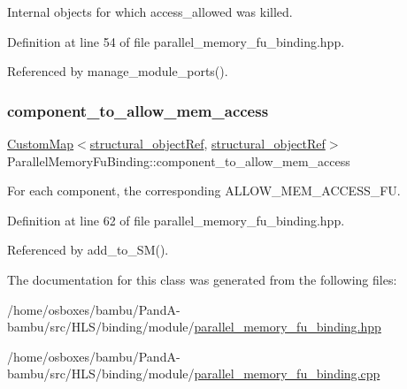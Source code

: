 Internal objects for which access\+\_\+allowed was killed. 



Definition at line 54 of file parallel\+\_\+memory\+\_\+fu\+\_\+binding.\+hpp.



Referenced by manage\+\_\+module\+\_\+ports().

\mbox{\label{classParallelMemoryFuBinding_a4f44f1a4a3686f6881467732a8935287}} 
\subsubsection{\texorpdfstring{component\+\_\+to\+\_\+allow\+\_\+mem\+\_\+access}{component\_to\_allow\_mem\_access}}
{\footnotesize\ttfamily \hyperlink{custom__map_8hpp_a18ca01763abbe3e5623223bfe5aaac6b}{Custom\+Map}$<$\hyperlink{structural__objects_8hpp_a8ea5f8cc50ab8f4c31e2751074ff60b2}{structural\+\_\+object\+Ref}, \hyperlink{structural__objects_8hpp_a8ea5f8cc50ab8f4c31e2751074ff60b2}{structural\+\_\+object\+Ref}$>$ Parallel\+Memory\+Fu\+Binding\+::component\+\_\+to\+\_\+allow\+\_\+mem\+\_\+access}



For each component, the corresponding A\+L\+L\+O\+W\+\_\+\+M\+E\+M\+\_\+\+A\+C\+C\+E\+S\+S\+\_\+\+FU. 



Definition at line 62 of file parallel\+\_\+memory\+\_\+fu\+\_\+binding.\+hpp.



Referenced by add\+\_\+to\+\_\+\+S\+M().



The documentation for this class was generated from the following files\+:\begin{DoxyCompactItemize}
\item 
/home/osboxes/bambu/\+Pand\+A-\/bambu/src/\+H\+L\+S/binding/module/\hyperlink{parallel__memory__fu__binding_8hpp}{parallel\+\_\+memory\+\_\+fu\+\_\+binding.\+hpp}\item 
/home/osboxes/bambu/\+Pand\+A-\/bambu/src/\+H\+L\+S/binding/module/\hyperlink{parallel__memory__fu__binding_8cpp}{parallel\+\_\+memory\+\_\+fu\+\_\+binding.\+cpp}\end{DoxyCompactItemize}
